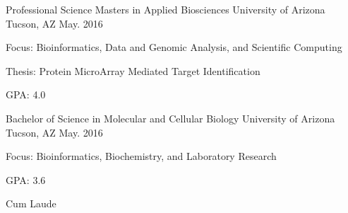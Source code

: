 

\begin{cventries}

  \cventry
    {Professional Science Masters in Applied Biosciences} %
    {University of Arizona} %
    {Tucson, AZ} %
    {May. 2016} %
    {
      \begin{cvitems} %
        \item {Focus: Bioinformatics, Data and Genomic Analysis, and Scientific Computing}
        \item {Thesis: Protein MicroArray Mediated Target Identification}
        \item {GPA: 4.0}
      \end{cvitems}
    }
  \cventry
    {Bachelor of Science in Molecular and Cellular Biology} %
    {University of Arizona} %
    {Tucson, AZ} %
    {May. 2016} %
    {
      \begin{cvitems} %
        \item {Focus: Bioinformatics, Biochemistry, and Laboratory Research}
        \item {GPA: 3.6}
        \item {Cum Laude}
      \end{cvitems}
    }
\end{cventries}
